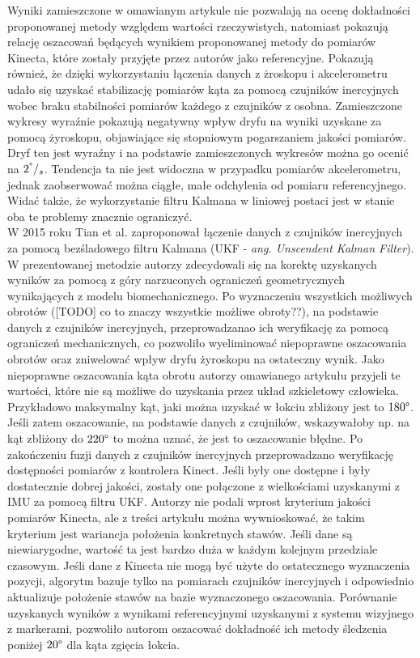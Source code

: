 Wyniki zamieszczone w omawianym artykule \cite{Bo2011a} nie pozwalają na ocenę dokładności proponowanej metody względem wartości rzeczywistych, natomiast pokazują relację oszacowań będących wynikiem proponowanej metody do pomiarów Kinecta, które zostały przyjęte przez autorów jako referencyjne. Pokazują również, że dzięki wykorzystaniu łączenia danych z żroskopu i akcelerometru udało się uzyskać stabilizację pomiarów kąta za pomocą czujników inercyjnych wobec braku stabilności pomiarów każdego z czujników z osobna. Zamieszczone wykresy wyraźnie pokazują negatywny wpływ dryfu na wyniki uzyskane za pomocą żyroskopu, objawiające się stopniowym pogarszaniem jakości pomiarów. Dryf ten jest wyraźny i na podstawie zamieszczonych wykresów można go ocenić na $2^\degree/_s$. Tendencja ta nie jest widoczna w przypadku pomiarów akcelerometru, jednak zaobserwować można ciągłe, małe odchylenia od pomiaru referencyjnego. Widać także, że wykorzystanie filtru Kalmana w liniowej postaci jest w stanie oba te problemy znacznie ograniczyć.\\

W 2015 roku Tian et al. \cite{Tian2015a} zaproponował łączenie danych z czujników inercyjnych za pomocą bezśladowego filtru Kalmana (UKF - \emph{ang. Unscendent Kalman Filter}). W prezentowanej metodzie autorzy zdecydowali się na korektę uzyskanych wyników za pomocą z góry narzuconych ograniczeń geometrycznych wynikających z modelu biomechanicznego. Po wyznaczeniu wszystkich możliwych obrotów ([TODO] co to znaczy wszystkie możliwe obroty??), na podstawie danych z czujników inercyjnych, przeprowadzanao ich weryfikację za pomocą ograniczeń mechanicznych, co pozwoliło wyeliminować niepoprawne oszacowania obrotów oraz zniwelować wpływ dryfu żyroskopu na ostateczny wynik. Jako niepoprawne oszacowania kąta obrotu autorzy omawianego artykułu przyjeli te wartości, które nie są możliwe do uzyskania przez układ szkieletowy człowieka. Przykładowo maksymalny kąt, jaki można uzyskać w łokciu zbliżony jest to $180\degree$. Jeśli zatem oszacowanie, na podstawie danych z czujników, wskazywałoby np. na kąt zbliżony do $220\degree$ to można uznać, że jest to oszacowanie błędne. Po zakończeniu fuzji danych z czujników inercyjnych przeprowadzano weryfikację dostępności pomiarów z kontrolera Kinect. Jeśli były one dostępne i były dostatecznie dobrej jakości, zostały one połączone z wielkościami uzyskanymi z IMU za pomocą filtru UKF. Autorzy nie podali wprost kryterium jakości pomiarów Kinecta, ale z treści artykułu można wywnioskować, że takim kryterium jest wariancja położenia konkretnych stawów. Jeśli dane są niewiarygodne, wartość ta jest bardzo duża w każdym kolejnym przedziale czasowym. Jeśli dane z Kinecta nie mogą być użyte do ostatecznego wyznaczenia pozycji, algorytm bazuje tylko na pomiarach czujników inercyjnych i odpowiednio aktualizuje położenie stawów na bazie wyznaczonego oszacowania. Porównanie uzyskanych wyników z wynikami referencyjnymi uzyskanymi z systemu wizyjnego z markerami, pozwoliło autorom oszacować dokładność ich metody śledzenia poniżej $20\degree$ dla kąta zgięcia łokcia.\\

